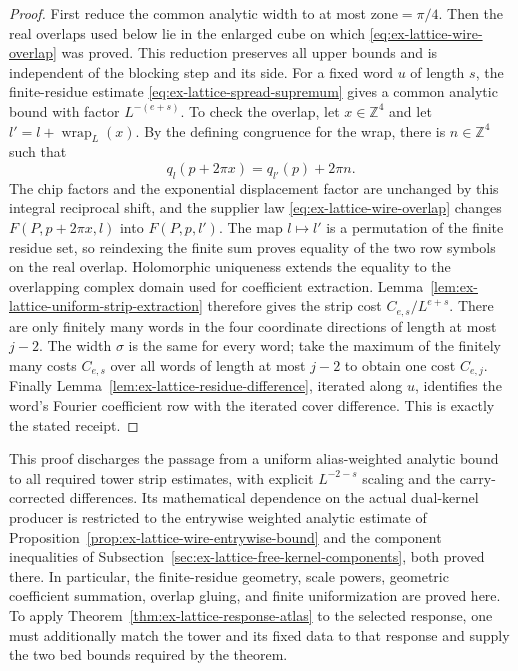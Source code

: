 \begin{proof}
First reduce the common analytic width to at most $\mathrm{zone}=\pi/4$.
Then the real overlaps used below lie in the enlarged cube on which
\eqref{eq:ex-lattice-wire-overlap} was proved. This reduction preserves all
upper bounds and is independent of the blocking step and its side.
For a fixed word $u$ of length $s$, the finite-residue estimate
\eqref{eq:ex-lattice-spread-supremum} gives a common analytic bound with
factor $L^{-(e+s)}$. To check the overlap, let $x\in\mathbb Z^4$ and let
$l'=l+\operatorname{wrap}_L(x)$. By the defining congruence for the wrap,
there is $n\in\mathbb Z^4$ such that
\[
 q_l(p+2\pi x)=q_{l'}(p)+2\pi n.
\]
The chip factors and the exponential displacement factor are unchanged by
this integral reciprocal shift, and the supplier law
\eqref{eq:ex-lattice-wire-overlap} changes $F(P,p+2\pi x,l)$ into
$F(P,p,l')$. The map $l\mapsto l'$ is a permutation of the finite residue
set, so reindexing the finite sum proves equality of the two row symbols on
the real overlap. Holomorphic uniqueness extends the equality to the
overlapping complex domain used for coefficient extraction.
Lemma~\ref{lem:ex-lattice-uniform-strip-extraction}
therefore gives the strip cost $C_{e,s}/L^{e+s}$. There are only finitely
many words in the four coordinate directions of length at most $j-2$.
The width $\sigma$ is the same for every word; take the maximum of the
finitely many costs $C_{e,s}$ over all words of length at most $j-2$ to
obtain one cost $C_{e,j}$. Finally
Lemma~\ref{lem:ex-lattice-residue-difference}, iterated along $u$, identifies
the word's Fourier coefficient row with the iterated cover difference.
This is exactly the stated receipt.
\end{proof}

\begin{remark}
This proof discharges the passage from a uniform alias-weighted analytic
bound to all required tower strip estimates, with explicit $L^{-2-s}$
scaling and the carry-corrected differences. Its mathematical dependence on
the actual dual-kernel producer is restricted to the entrywise weighted
analytic estimate of Proposition~\ref{prop:ex-lattice-wire-entrywise-bound} and the
component inequalities of Subsection~\ref{sec:ex-lattice-free-kernel-components},
both proved there. In particular, the
finite-residue geometry, scale powers, geometric coefficient summation,
overlap gluing, and finite uniformization are proved here. To apply
Theorem~\ref{thm:ex-lattice-response-atlas} to the selected response, one
must additionally match the tower and its fixed data to that response and
supply the two bed bounds required by the theorem.
\label{rem:ex-lattice-free-kernel-inputs}
\end{remark}
